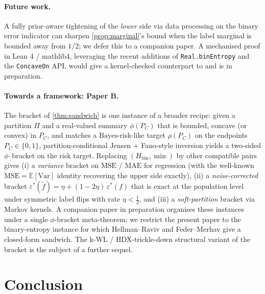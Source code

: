 \documentclass[10pt]{article}
\theoremstyle{definition}
\theoremstyle{remark}
\newcommand{\Hbin}{H_{\mathrm{bin}}}
\newcommand{\eps}{\varepsilon}
\newcommand{\E}{\mathbb{E}}
\begin{document}
\paragraph{Future work.} A fully prior-aware tightening of the
\emph{lower} side via data processing on the binary error
indicator \citep{hanverdu1994,ho2010interplay} can sharpen
\cref{prop:marginal}'s bound when the label marginal is bounded
away from $1/2$; we defer this to a companion paper. A
mechanised proof in Lean 4 / mathlib4, leveraging the recent
additions of \texttt{Real.binEntropy} and the \texttt{ConcaveOn}
API, would give a kernel-checked counterpart to 
and is in preparation.

\paragraph{Towards a framework: Paper B.} The bracket of
\cref{thm:sandwich} is one instance of a broader recipe:
given a partition $\Pi$ and a real-valued summary $\phi(P_{C})$
that is bounded, concave (or convex) in $P_{C}$, and matches a
$\mathrm{Bayes}$-risk-like target $\rho(P_{C})$ on the endpoints
$P_{C} \in \{0, 1\}$, partition-conditional Jensen + Fano-style
inversion yields a two-sided $\phi$--bracket on the risk
target. Replacing $(\Hbin, \min)$ by other compatible pairs
gives (i) a \emph{variance} bracket on $\mathrm{MSE}$ /
$\mathrm{MAE}$ for regression (with the well-known
$\mathrm{MSE} = \E[\mathrm{Var}]$ identity recovering the
upper side exactly), (ii) a \emph{noise-corrected} bracket
$\eps^{*}(\widetilde{f}) = \eta + (1 - 2\eta)\,\eps^{*}(f)$
that is exact at the population level under symmetric label
flips with rate $\eta < \tfrac{1}{2}$, and (iii) a
\emph{soft-partition} bracket via Markov kernels. A companion
paper in preparation organises these instances under a single
$\phi$-bracket meta-theorem; we restrict the present paper to
the binary-entropy instance for which Hellman--Raviv and
Feder--Merhav give a closed-form sandwich. The k-WL /
HDX-trickle-down structural variant of the bracket
\citep[k\text{-}WL refinement chain]{morris2019wl} is the
subject of a further sequel.

\section{Conclusion}\label{sec:conclusion}
\end{document}
